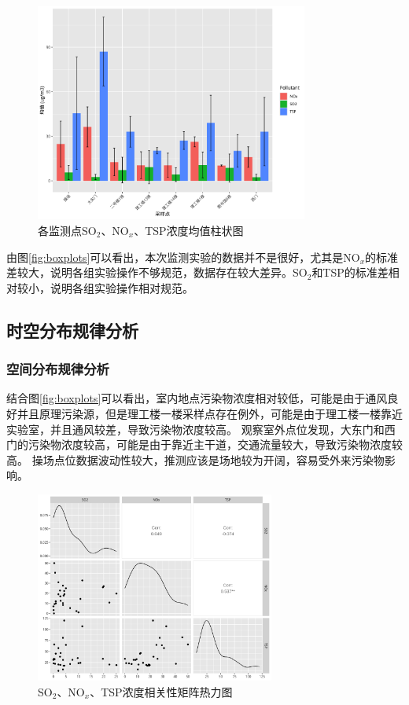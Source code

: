 \documentclass[12pt,hyperref,a4paper,UTF8]{ctexart}
\begin{document}
\begin{figure}[htbp]
    \centering
    \includegraphics[width=0.8\textwidth]{dataout/site_mean_bar.png}
    \caption{各监测点SO$_2$、NO$_x$、TSP浓度均值柱状图}
    \label{fig:site_mean_bar}
\end{figure}

由图\ref{fig:boxplots}可以看出，本次监测实验的数据并不是很好，尤其是NO$_x$的标准差较大，说明各组实验操作不够规范，数据存在较大差异。SO$_2$和TSP的标准差相对较小，说明各组实验操作相对规范。

\subsection{时空分布规律分析}
\subsubsection{空间分布规律分析}
结合图\ref{fig:boxplots}可以看出，室内地点污染物浓度相对较低，可能是由于通风良好并且原理污染源，但是理工楼一楼采样点存在例外，可能是由于理工楼一楼靠近实验室，并且通风较差，导致污染物浓度较高。
观察室外点位发现，大东门和西门的污染物浓度较高，可能是由于靠近主干道，交通流量较大，导致污染物浓度较高。
操场点位数据波动性较大，推测应该是场地较为开阔，容易受外来污染物影响。

\begin{figure}[htbp]
    \centering
    \includegraphics[width=0.7\textwidth]{dataout/cor_matrix.png}
    \caption{SO$_2$、NO$_x$、TSP浓度相关性矩阵热力图}
    \label{fig:cor_matrix}
\end{figure}
\end{document}
